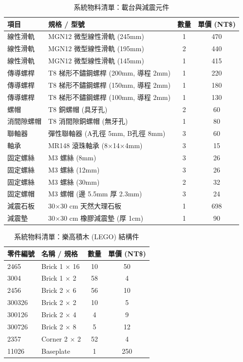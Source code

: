 \begin{table}[H]
    \centering
    \caption{系統物料清單：載台與減震元件}
    \label{tab:bom_stage}
    \begin{tabular}{llcc}
        \toprule
        項目 & 規格 / 型號 & 數量 & 單價 (NT\$) \\
        \midrule
        線性滑軌 & MGN12 微型線性滑軌 (245mm) & 1 & 470 \\
        線性滑軌 & MGN12 微型線性滑軌 (195mm) & 2 & 440 \\
        線性滑軌 & MGN12 微型線性滑軌 (145mm) & 1 & 415 \\
        傳導螺桿 & T8 梯形不鏽鋼螺桿 (200mm, 導程 2mm) & 1 & 220 \\
        傳導螺桿 & T8 梯形不鏽鋼螺桿 (150mm, 導程 2mm) & 1 & 180 \\
        傳導螺桿 & T8 梯形不鏽鋼螺桿 (100mm, 導程 2mm) & 1 & 130 \\
        螺帽 & T8 銅螺帽 (具牙孔) & 2 & 60 \\
        消間隙螺帽 & T8 消間隙銅螺帽 (無牙孔) & 1 & 80 \\
        聯軸器 & 彈性聯軸器 (A孔徑 5mm, B孔徑 8mm) & 3 & 60 \\
        軸承 & MR148 滾珠軸承 (8$\times$14$\times$4mm) & 3 & 15 \\
        固定螺絲 & M3 螺絲 (8mm) & 3 & 26 \\
        固定螺絲 & M3 螺絲 (12mm) & 3 & 26 \\
        固定螺絲 & M3 螺絲 (30mm) & 2 & 32 \\
        固定螺帽 & M3 螺帽 (邊 5.5mm 厚 2.3mm) & 3 & 24 \\
        減震石板 & 30$\times$30 cm 天然大理石板 & 1 & 698 \\
        減震墊 & 30$\times$30 cm 橡膠減震墊 (厚 1cm) & 1 & 90 \\
        \bottomrule
    \end{tabular}
\end{table}

\begin{table}[H]
    \centering
    \caption{系統物料清單：樂高積木 (LEGO) 結構件}
    \label{tab:bom_lego}
    \begin{tabular}{llcc}
        \toprule
        零件編號 & 名稱 / 規格 & 數量 & 單價 (NT\$) \\
        \midrule
        2465 & Brick 1 $\times$ 16 & 10 & 50 \\
        3004 & Brick 1 $\times$ 2 & 58 & 4 \\
        2456 & Brick 2 $\times$ 6 & 56 & 10 \\
        300326 & Brick 2 $\times$ 2 & 10 & 5 \\
        300126 & Brick 2 $\times$ 4 & 4 & 9 \\
        300726 & Brick 2 $\times$ 8 & 5 & 12 \\
        2357 & Corner 2 $\times$ 2 & 52 & 4 \\
        11026 & Baseplate & 1 & 250 \\
        \bottomrule
    \end{tabular}
\end{table}

